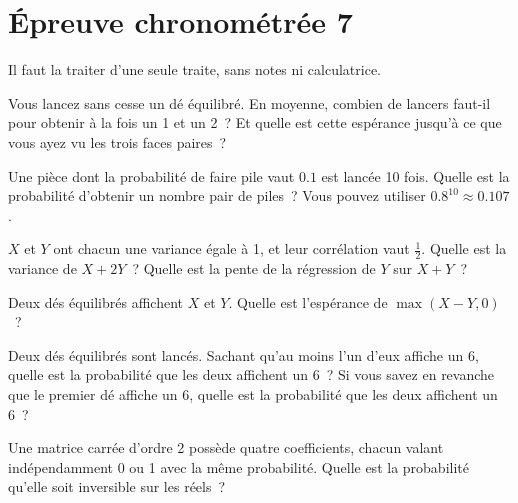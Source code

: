 \chapter{Épreuve chronométrée 7}\label{ch:iv1:timed-test-7}

\begin{ivtrains}
Il faut la traiter d'une seule traite, sans notes ni calculatrice.
\end{ivtrains}


\begin{question}\label{iq:iv1:timed-test-7:1}
Vous lancez sans cesse un dé équilibré. En moyenne, combien de lancers faut-il pour obtenir à la fois un 1 et un 2~? Et quelle est cette espérance jusqu'à ce que vous ayez vu les trois faces paires~?
\end{question}

\begin{question}\label{iq:iv1:timed-test-7:2}
Une pièce dont la probabilité de faire pile vaut $0.1$ est lancée 10 fois. Quelle est la probabilité d'obtenir un nombre pair de piles~? Vous pouvez utiliser $0.8^{10} \approx 0.107$.
\end{question}

\begin{question}\label{iq:iv1:timed-test-7:3}
$X$ et $Y$ ont chacun une variance égale à 1, et leur corrélation vaut $\frac12$. Quelle est la variance de $X + 2Y$~? Quelle est la pente de la régression de $Y$ sur $X + Y$~?
\end{question}

\begin{question}\label{iq:iv1:timed-test-7:4}
Deux dés équilibrés affichent $X$ et $Y$. Quelle est l'espérance de $\max(X - Y, 0)$~?
\end{question}

\begin{question}\label{iq:iv1:timed-test-7:5}
Deux dés équilibrés sont lancés. Sachant qu'au moins l'un d'eux affiche un 6, quelle est la probabilité que les deux affichent un 6~? Si vous savez en revanche que le premier dé affiche un 6, quelle est la probabilité que les deux affichent un 6~?
\end{question}

\begin{question}\label{iq:iv1:timed-test-7:6}
Une matrice carrée d'ordre 2 possède quatre coefficients, chacun valant indépendamment 0 ou 1 avec la même probabilité. Quelle est la probabilité qu'elle soit inversible sur les réels~?
\end{question}

